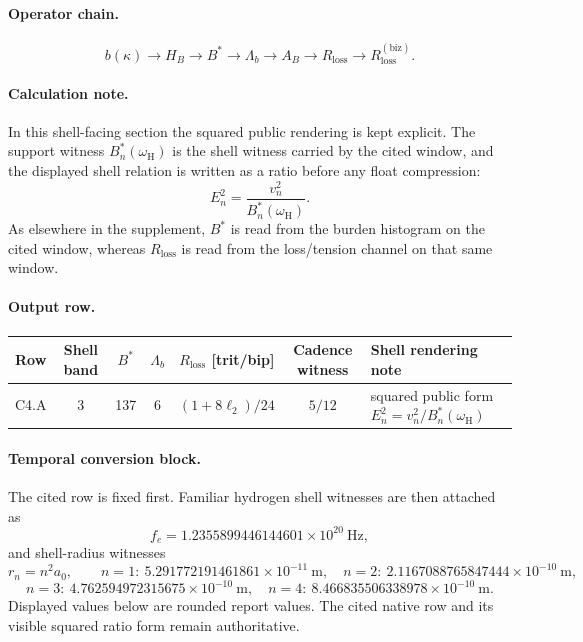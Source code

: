 \paragraph{Operator chain.}
\[
b(\kappa)\to H_B\to B^*\to \Lambda_b\to A_B\to R_{\mathrm{loss}}\to R_{\mathrm{loss}}^{(\mathrm{biz})}.
\]

\paragraph{Calculation note.} In this shell-facing section the squared public rendering is kept explicit. The support witness $B_n^*(\omega_{\mathrm{H}})$ is the shell witness carried by the cited window, and the displayed shell relation is written as a ratio before any float compression:
\[
E_n^2 = \frac{v_n^2}{B_n^*(\omega_{\mathrm{H}})}.
\]
As elsewhere in the supplement, $B^*$ is read from the burden histogram on the cited window, whereas $R_{\mathrm{loss}}$ is read from the loss/tension channel on that same window.

\paragraph{Output row.}
\begin{center}
\small
\begin{tabularx}{\linewidth}{@{}lcccccX@{}}
\toprule
Row & Shell band & $B^*$ & $\Lambda_b$ & $R_{\mathrm{loss}}$ [trit/bip] & Cadence witness & Shell rendering note \\
\midrule
C4.A & 3 & 137 & 6 & $(1+8\ell_2)/24$ & $5/12$ & squared public form $E_n^2=v_n^2/B_n^*(\omega_{\mathrm{H}})$ \\
\bottomrule
\end{tabularx}
\end{center}

\paragraph{Temporal conversion block.} The cited row is fixed first. Familiar hydrogen shell witnesses are then attached as
\[
f_e = 1.2355899446144601\times 10^{20}\ \text{Hz},
\]
and shell-radius witnesses
\[
r_n = n^2 a_0,\qquad
n=1:\ 5.291772191461861\times 10^{-11}\ \text{m},\quad
n=2:\ 2.1167088765847444\times 10^{-10}\ \text{m},
\]
\[
n=3:\ 4.762594972315675\times 10^{-10}\ \text{m},\quad
n=4:\ 8.466835506338978\times 10^{-10}\ \text{m}.
\]
Displayed values below are rounded report values. The cited native row and its visible squared ratio form remain authoritative.

